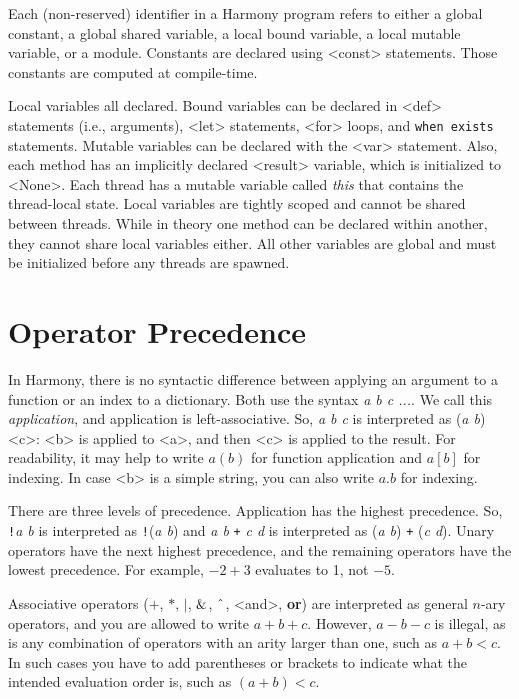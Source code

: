 \documentclass{report}
\begin{document}
Each (non-reserved) identifier in a Harmony program refers to either
a global constant, a global shared variable, a local bound variable,
a local mutable variable, or a module.
Constants are declared using <{const}> statements.
Those constants are computed at compile-time.

Local variables all declared.
Bound variables can be declared in
<{def}> statements (i.e., arguments),
<{let}> statements, <{for}> loops, and \texttt{when exists} statements.
Mutable variables can be declared with the <{var}> statement.
Also, each method has an implicitly declared
<{result}> variable, which is initialized to <{None}>.
Each thread has a mutable variable called \textit{this} that contains
the thread-local state.
Local variables are tightly scoped and cannot be shared
between threads.
While in theory one method can be declared within another,
they cannot share local variables either.
All other variables are global and must be initialized
before any threads are spawned.

\section{Operator Precedence}

In Harmony, there is no syntactic difference between applying an argument to a function
or an index to a dictionary.  Both use the syntax \textit{a b c ...}.
We call this \emph{application}, and application is left-associative.
So, \textit{a b c} is interpreted as (\textit{a b}) <{c}>: <{b}> is applied to <{a}>,
and then <{c}> is applied to the result.
For readability, it may help to write $a(b)$ for function application and
$a[b]$ for indexing.  In case <{b}> is a simple string,
you can also write $a.b$ for indexing.

There are three levels of precedence.
Application has the highest precedence.  So, \texttt{!}\textit{a b} is interpreted as
\texttt{!}(\textit{a b}) and \textit{a b} \texttt{+} \textit{c d} is interpreted as
(\textit{a b}) \texttt{+} (\textit{c d}).
Unary operators have the next highest precedence,
and the remaining operators have the lowest precedence.
For example, $-2 + 3$ evaluates to 1, not $-5$.

Associative operators ($+$, $*$, $|$, $\string&$, $\string^$, <{and}>, \textbf{or})
are interpreted as general $n$-ary operators, and you are allowed to write
$a + b + c$.  However, $a - b - c$ is illegal, as is any combination of operators with an
arity larger than one, such as $a + b < c$.
In such cases you have to add parentheses or brackets to indicate what
the intended evaluation order is, such as $(a + b) < c$.
\end{document}
